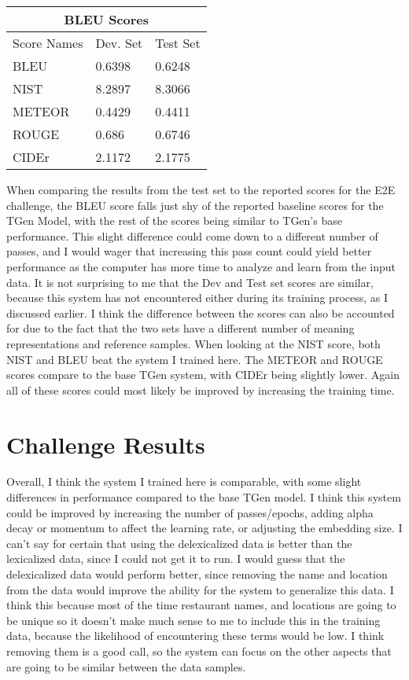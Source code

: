 \documentclass[12pt]{article}
\begin{document}
\begin{center}
    \begin{tabular}{|p{3cm}|p{3cm}|p{3cm}|  }
        \hline
        \multicolumn{3}{|c|}{BLEU Scores} \\
        \hline
        Score Names & Dev. Set & Test Set \\
        \hline
        BLEU & 0.6398 & 0.6248 \\
        NIST & 8.2897 & 8.3066 \\
        METEOR & 0.4429 & 0.4411 \\
        ROUGE & 0.686 & 0.6746 \\
        CIDEr & 2.1172 & 2.1775 \\
        \hline
    \end{tabular}
\end{center}

When comparing the results from the test set to the reported scores for the E2E challenge, the BLEU score falls just shy of the reported baseline scores for the TGen Model, with the rest of the scores being similar to TGen's base performance. This slight difference could come down to a different number of passes, and I would wager that increasing this pass count could yield better performance as the computer has more time to analyze and learn from the input data. It is not surprising to me that the Dev and Test set scores are similar, because this system has not encountered either during its training process, as I discussed earlier. I think the difference between the scores can also be accounted for due to the fact that the two sets have a different number of meaning representations and reference samples. When looking at the NIST score, both NIST and BLEU beat the system I trained here. The METEOR and ROUGE scores compare to the base TGen system, with CIDEr being slightly lower. Again all of these scores could most likely be improved by increasing the training time. \\

\section{Challenge Results}
Overall, I think the system I trained here is comparable, with some slight differences in performance compared to the base TGen model. I think this system could be improved by increasing the number of passes/epochs, adding alpha decay or momentum to affect the learning rate, or adjusting the embedding size. I can't say for certain that using the delexicalized data is better than the lexicalized data, since I could not get it to run. I would guess that the delexicalized data would perform better, since removing the name and location from the data would improve the ability for the system to generalize this data. I think this because most of the time restaurant names, and locations are going to be unique so it doesn't make much sense to me to include this in the training data, because the likelihood of encountering these terms would be low. I think removing them is a good call, so the system can focus on the other aspects that are going to be similar between the data samples.\\
\end{document}
